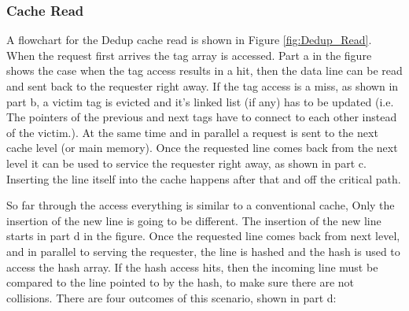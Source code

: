 \subsubsection{Cache Read}
A flowchart for the Dedup cache read is shown in Figure \ref{fig:Dedup_Read}. When the request first arrives the tag array is accessed. Part a in the figure shows the case when the tag access results in a hit, then the data line can be read and sent back to the requester right away. If the tag access is a miss, as shown in part b, a victim tag is evicted and it's linked list (if any) has to be updated (i.e. The pointers of the previous and next tags have to connect to each other instead of the victim.). At the same time and in parallel a request is sent to the next cache level (or main memory). Once the requested line comes back from the next level it can be used to service the requester right away, as shown in part c. Inserting the line itself into the cache happens after that and off the critical path.\par
So far through the access everything is similar to a conventional cache, Only the insertion of the new line is going to be different. The insertion of the new line starts in part d in the figure. Once the requested line comes back from next level, and in parallel to serving the requester, the line is hashed and the hash is used to access the hash array.
If the hash access hits, then the incoming line must be compared to the line pointed to by the hash, to make sure there are not collisions. There are four outcomes of this scenario, shown in part d:
